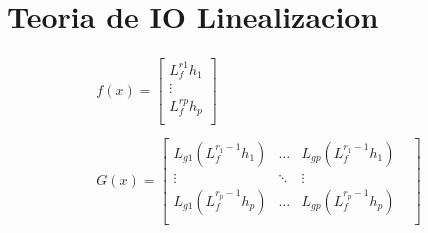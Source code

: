 \documentclass[varwidth,margin=3mm]{standalone}
\begin{document}
\section{Teoria de IO Linealizacion}
\begin{gather*}
	f(x) = \left [ 
	\begin{matrix}
		L^{r{1}}_fh_1\\
		\vdots\\
		L^{r{p}}_fh_p\\
	\end{matrix}
	\right ]
	\\
	\\
	G(x) = 
	\left [ 
	\begin{matrix}
		L_{g{1}}\left(L^{r_1-1}_fh_1\right)  & \hdots  & L_{g{p}}\left(L^{r_1-1}_fh_1\right)  & \\
		\vdots  & \ddots & \vdots  & \\
		L_{g{1}}\left(L^{r_p-1}_fh_p\right)  & \hdots  & L_{g{p}}\left(L^{r_p-1}_fh_p\right) & \\
	\end{matrix}
	\right ]
\end{gather*}
\end{document}
